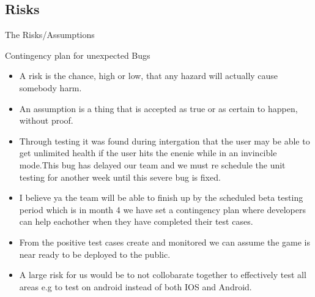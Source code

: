 
\subsection{Risks}
The Risks/Assumptions



\centerline{Contingency plan for unexpected Bugs}



\begin{itemize}

	\item A risk is the chance, high or low, that any hazard will actually cause somebody harm. 


	\item An assumption is a thing that is accepted as true or as certain to happen, without proof.


  \item Through testing it was found during intergation that the user may be able to get unlimited health if the user hits the enenie while in an invincible mode.This bug has delayed our team and we must re schedule the unit testing for another week until this severe bug is fixed.

  \item I believe ya the team will be able to finish up by the scheduled beta testing period which is in month 4 we have set a contingency plan where developers can help eachother when they have completed their test cases.



  \item From the positive test cases create and monitored we can assume the game is near ready to be deployed to the public. 

  \item A large risk for us would be to not collobarate together to effectively test all areas e.g to test on android instead of both IOS and Android.

\end{itemize}